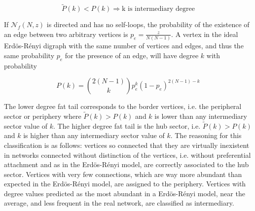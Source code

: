\documentclass[%
	aip,
	jmp,%
	amsmath,amssymb,
	reprint,%
]{revtex4-1}
\begin{document}
\begin{equation}\label{criterio}
	\widetilde{P}(k)<P(k) \Rightarrow \text{k is intermediary degree}
\end{equation}

If $\mathcal{N}_f(N,z)$ is directed and has no self-loops, the probability of the existence
of an edge between two arbitrary vertices is $p_e=\frac{z}{N(N-1)}$.
A vertex in the ideal Erd\"os-R\'enyi digraph with the same number of vertices and edges, and thus the same probability $p_e$ for the presence of an edge, will have degree $k$ with probability

\begin{equation}
	P(k)=\binom{2(N-1)}{k}p_e^k(1-p_e)^{2(N-1)-k}
\end{equation}

The lower degree fat tail corresponds to the border vertices, i.e. the peripheral sector or periphery where $\widetilde{P}(k)>P(k)$ and $k$ is lower than any intermediary sector value of $k$.
The higher degree fat tail is the hub sector, i.e. $\widetilde{P}(k)>P(k)$ and $k$ is higher than any intermediary sector value of $k$.
The reasoning for this classification is as follows: vertices so connected that they are virtually inexistent in networks connected without distinction of the vertices, i.e. without preferential attachment and as in the Erd\"os-R\'enyi model, are correctly associated to the hub sector.
Vertices with very few connections, which are way more abundant than expected in the Erd\"os-R\'enyi model, are assigned to the periphery.
Vertices with degree values predicted as the most abundant in a Erd\"os-R\'enyi model,
near the average, and less frequent in the real network, are classified as intermediary.
\end{document}
